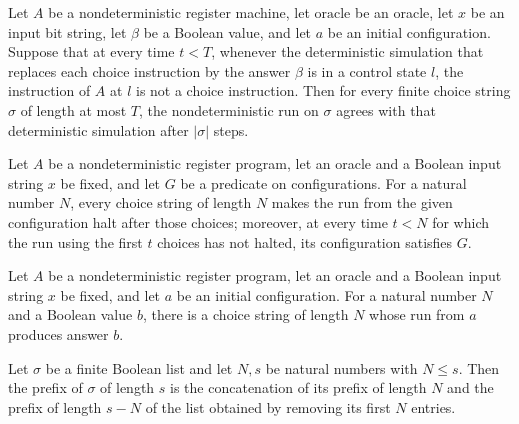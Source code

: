 \begin{lemma}
\label{Complexity.LogProg.narun_eq_arun}
\leanok
{}
Let $A$ be a nondeterministic register machine, let $\text{oracle}$ be an oracle, let
$x$ be an input bit string, let $\beta$ be a Boolean value, and let $a$ be an initial
configuration. Suppose that at every time $t<T$, whenever the deterministic simulation
that replaces each choice instruction by the answer $\beta$ is in a control state $l$,
the instruction of $A$ at $l$ is not a choice instruction. Then for every finite choice
string $\sigma$ of length at most $T$, the nondeterministic run on $\sigma$ agrees with
that deterministic simulation after $|\sigma|$ steps.
\end{lemma}

\begin{definition}
\label{Complexity.LogProg.NHalts}
\leanok
{}
Let $A$ be a nondeterministic register program, let an oracle and a Boolean input string
$x$ be fixed, and let $G$ be a predicate on configurations. For a natural number $N$,
every choice string of length $N$ makes the run from the given configuration halt after
those choices; moreover, at every time $t<N$ for which the run using the first $t$
choices has not halted, its configuration satisfies $G$.
\end{definition}

\begin{definition}
\label{Complexity.LogProg.NAns}
\leanok
{}
Let $A$ be a nondeterministic register program, let an oracle and a Boolean input string
$x$ be fixed, and let $a$ be an initial configuration. For a natural number $N$ and a
Boolean value $b$, there is a choice string of length $N$ whose run from $a$ produces
answer $b$.
\end{definition}

\begin{lemma}
\label{Complexity.LogProg.take_split}
\leanok
{}
Let $\sigma$ be a finite Boolean list and let $N,s$ be natural numbers with $N\le s$.
Then the prefix of $\sigma$ of length $s$ is the concatenation of its prefix of length
$N$ and the prefix of length $s-N$ of the list obtained by removing its first $N$
entries.
\end{lemma}

